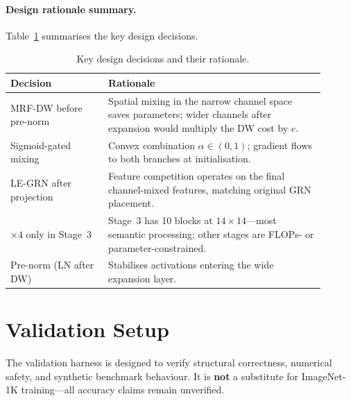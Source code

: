\documentclass{article}
\begin{document}
\paragraph{Design rationale summary.}
Table~\ref{tab:design_rationale} summarises the key design decisions.

\begin{table}[h]
  \centering
  \caption{Key design decisions and their rationale.}
  \label{tab:design_rationale}
  \begin{tabular}{p{0.28\linewidth} p{0.62\linewidth}}
  \toprule
  \textbf{Decision} & \textbf{Rationale} \\
  \midrule
  MRF-DW before pre-norm &
    Spatial mixing in the narrow channel space saves parameters;
    wider channels after expansion would multiply the DW cost by $e$. \\
  \addlinespace
  Sigmoid-gated mixing &
    Convex combination $\alpha \in (0,1)$; gradient flows to both
    branches at initialisation. \\
  \addlinespace
  LE-GRN after projection &
    Feature competition operates on the final channel-mixed features,
    matching original GRN placement. \\
  \addlinespace
  $\times4$ only in Stage~3 &
    Stage~3 has 10 blocks at $14\times14$---most semantic processing;
    other stages are FLOPs- or parameter-constrained. \\
  \addlinespace
    Pre-norm (LN after DW) &
    Stabilises activations entering the wide expansion layer. \\
  \bottomrule
  \end{tabular}
\end{table}

\section{Validation Setup}
\label{sec:validation}

The validation harness is designed to verify structural correctness,
numerical safety, and synthetic benchmark behaviour.  It is \textbf{not}
a substitute for ImageNet-1K training---all accuracy claims remain
unverified.
\end{document}
